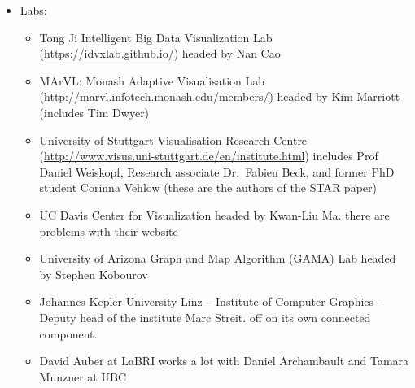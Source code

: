 




\begin{itemize}
\tightlist
\item
  Labs:

  \begin{itemize}
  \tightlist
  \item
    Tong Ji Intelligent Big Data Visualization Lab
    (\url{https://idvxlab.github.io/}) headed by Nan Cao
  \item
    MArVL: Monash Adaptive Visualisation Lab
    (\url{http://marvl.infotech.monash.edu/members/}) headed by Kim
    Marriott (includes Tim Dwyer)
  \item
    University of Stuttgart Visualisation Research Centre
    (\url{http://www.visus.uni-stuttgart.de/en/institute.html}) includes
    Prof Daniel Weiskopf, Research associate Dr.~Fabien Beck, and former
    PhD student Corinna Vehlow (these are the authors of the STAR paper)
  \item
    UC Davis Center for Visualization headed by Kwan-Liu Ma. there are
    problems with their website
  \item
    University of Arizona Graph and Map Algorithm (GAMA) Lab headed by
    Stephen Kobourov
  \item
    Johannes Kepler University Linz -- Institute of Computer Graphics --
    Deputy head of the institute Marc Streit. off on its own connected
    component.
  \item
    David Auber at LaBRI works a lot with Daniel Archambault and Tamara
    Munzner at UBC
  \end{itemize}
\end{itemize}

